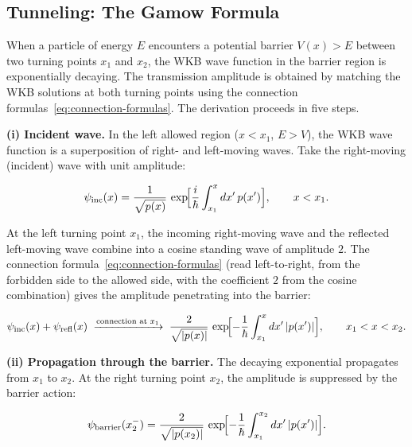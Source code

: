 \subsection{Tunneling: The Gamow Formula}

When a particle of energy $E$ encounters a potential barrier $V(x) > E$ between two turning points $x_1$ and $x_2$, the WKB wave function in the barrier region is exponentially decaying. The transmission amplitude is obtained by matching the WKB solutions at both turning points using the connection formulas~\eqref{eq:connection-formulas}. The derivation proceeds in five steps.

\medskip\noindent\textbf{(i) Incident wave.} In the left allowed region ($x < x_1$, $E > V$), the WKB wave function is a superposition of right- and left-moving waves. Take the right-moving (incident) wave with unit amplitude:
\begin{linenomath}
\begin{equation*}
\psi_{\text{inc}}(x) = \frac{1}{\sqrt{p(x)}}\,
\exp\!\Bigl[\frac{i}{\hbar}\int_{x_1}^x dx'\,p(x')\Bigr], \qquad x < x_1 .
\end{equation*}
\end{linenomath}
At the left turning point $x_1$, the incoming right-moving wave and the reflected left-moving wave combine into a cosine standing wave of amplitude $2$. The connection formula~\eqref{eq:connection-formulas} (read left-to-right, from the forbidden side to the allowed side, with the coefficient $2$ from the cosine combination) gives the amplitude penetrating into the barrier:
\begin{linenomath}
\begin{equation*}
\psi_{\text{inc}}(x) + \psi_{\text{refl}}(x)
\;\xrightarrow{\text{connection at }x_1}\;
\frac{2}{\sqrt{|p(x)|}}\,
\exp\!\Bigl[-\frac{1}{\hbar}\int_{x_1}^x dx'\,|p(x')|\Bigr], \qquad x_1 < x < x_2 .
\end{equation*}
\end{linenomath}

\medskip\noindent\textbf{(ii) Propagation through the barrier.} The decaying exponential propagates from $x_1$ to $x_2$. At the right turning point $x_2$, the amplitude is suppressed by the barrier action:
\begin{linenomath}
\begin{equation*}
\psi_{\text{barrier}}(x_2^-) = \frac{2}{\sqrt{|p(x_2)|}}\,
\exp\!\Bigl[-\frac{1}{\hbar}\int_{x_1}^{x_2} dx'\,|p(x')|\Bigr].
\end{equation*}
\end{linenomath}

